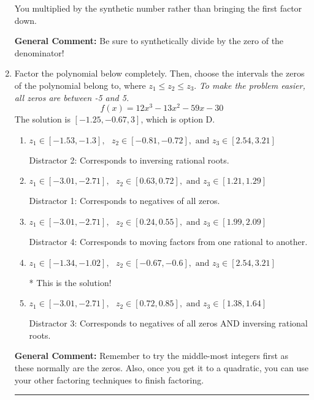 \documentclass{extbook}[14pt]
\newcommand{\litem}[1]{\item #1

\rule{\textwidth}{0.4pt}}
\begin{document}
\begin{enumerate}
{\begin{enumerate}[label=\Alph*.]
 You multiplied by the synthetic number rather than bringing the first factor down.
\end{enumerate}

\textbf{General Comment:} Be sure to synthetically divide by the zero of the denominator!
}
\litem{
Factor the polynomial below completely. Then, choose the intervals the zeros of the polynomial belong to, where $z_1 \leq z_2 \leq z_3$. \textit{To make the problem easier, all zeros are between -5 and 5.}
\[ f(x) = 12x^{3} -13 x^{2} -59 x -30 \]The solution is \( [-1.25, -0.67, 3] \), which is option D.\begin{enumerate}[label=\Alph*.]
\item \( z_1 \in [-1.53, -1.3], \text{   }  z_2 \in [-0.81, -0.72], \text{   and   } z_3 \in [2.54, 3.21] \)

 Distractor 2: Corresponds to inversing rational roots.
\item \( z_1 \in [-3.01, -2.71], \text{   }  z_2 \in [0.63, 0.72], \text{   and   } z_3 \in [1.21, 1.29] \)

 Distractor 1: Corresponds to negatives of all zeros.
\item \( z_1 \in [-3.01, -2.71], \text{   }  z_2 \in [0.24, 0.55], \text{   and   } z_3 \in [1.99, 2.09] \)

 Distractor 4: Corresponds to moving factors from one rational to another.
\item \( z_1 \in [-1.34, -1.02], \text{   }  z_2 \in [-0.67, -0.6], \text{   and   } z_3 \in [2.54, 3.21] \)

* This is the solution!
\item \( z_1 \in [-3.01, -2.71], \text{   }  z_2 \in [0.72, 0.85], \text{   and   } z_3 \in [1.38, 1.64] \)

 Distractor 3: Corresponds to negatives of all zeros AND inversing rational roots.
\end{enumerate}

\textbf{General Comment:} Remember to try the middle-most integers first as these normally are the zeros. Also, once you get it to a quadratic, you can use your other factoring techniques to finish factoring.
}
\end{enumerate}
\end{document}
